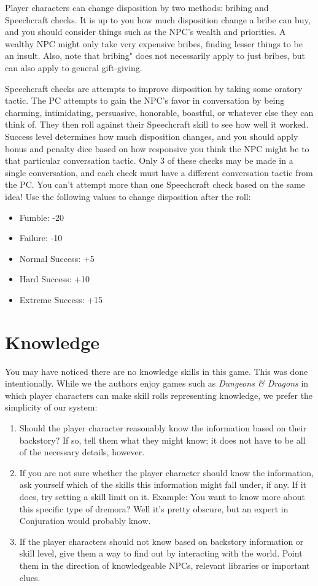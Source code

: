 \documentclass[12pt]{book}
\begin{document}
Player characters can change disposition by two methods: bribing and Speechcraft checks. It is up to you how much disposition change a bribe can buy, and you should consider things such as the NPC's wealth and priorities. A wealthy NPC might only take very expensive bribes, finding lesser things to be an insult. Also, note that bribing" does not necessarily apply to just bribes, but can also apply to general gift-giving.

Speechcraft checks are attempts to improve disposition by taking some oratory tactic. The PC attempts to gain the NPC's favor in conversation by being charming, intimidating, persuasive, honorable, boastful, or whatever else they can think of. They then roll against their Speechcraft skill to see how well it worked. Success level determines how much disposition changes, and you should apply bonus and penalty dice based on how responsive you think the NPC might be to that particular conversation tactic. Only 3 of these checks may be made in a single conversation, and each check must have a different conversation tactic from the PC. You can't attempt more than one Speechcraft check based on the same idea! Use the following values to change disposition after the roll:

\begin{itemize}
	\item Fumble: -20
	\item Failure: -10
	\item Normal Success: +5
	\item Hard Success: +10
	\item Extreme Success: +15
\end{itemize}

\section{Knowledge}
You may have noticed there are no knowledge skills in this game. This was done intentionally. While we the authors enjoy games such as \textit{Dungeons \& Dragons} in which player characters can make skill rolls representing knowledge, we prefer the simplicity of our system:

\begin{enumerate}
	\item Should the player character reasonably know the information based on their backstory? If so, tell them what they might know; it does not have to be all of the necessary details, however.
	\item If you are not sure whether the player character should know the information, ask yourself which of the skills this information might fall under, if any. If it does, try setting a skill limit on it. Example: You want to know more about this specific type of dremora? Well it's pretty obscure, but an expert in Conjuration would probably know.
	\item If the player characters should not know based on backstory information or skill level, give them a way to find out by interacting with the world. Point them in the direction of knowledgeable NPCs, relevant libraries or important clues.
\end{enumerate}
\end{document}
